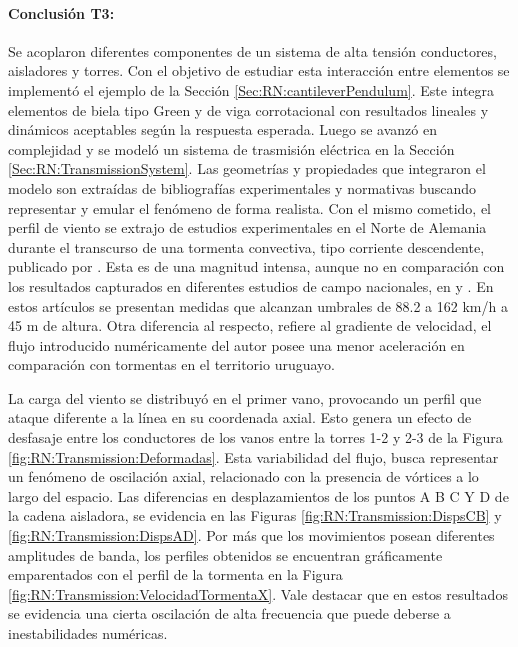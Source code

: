 \paragraph*{Conclusión T3:}
Se acoplaron diferentes componentes de un sistema de alta tensión conductores, aisladores y torres. Con el objetivo de estudiar esta interacción entre elementos se implementó el ejemplo de la Sección \ref{Sec:RN:cantileverPendulum}. Este integra elementos de biela tipo Green y de viga corrotacional con resultados lineales y dinámicos aceptables según la respuesta esperada. Luego se avanzó en complejidad y se modeló un sistema de trasmisión eléctrica en la Sección \ref{Sec:RN:TransmissionSystem}. Las geometrías y propiedades que integraron el modelo son extraídas de bibliografías experimentales y normativas buscando representar y emular el fenómeno de forma realista.  Con el mismo cometido, el perfil de viento se extrajo de estudios experimentales en el Norte de Alemania durante el transcurso de una tormenta convectiva, tipo corriente descendente, publicado por \cite{stengel2017measurements}. Esta es de una magnitud intensa, aunque no en comparación con los resultados capturados en diferentes estudios de campo nacionales, en \citep{duranona2009analysis} y \citep{duranona2019first}. En estos artículos se presentan medidas que alcanzan umbrales de 88.2 a 162 km/h a 45 m de altura. Otra diferencia al respecto, refiere al gradiente de velocidad, el flujo introducido numéricamente del autor \citeauthor{stengel2017measurements} posee una menor aceleración en comparación con tormentas en el territorio uruguayo. 

La carga del viento se distribuyó en el primer vano, provocando un perfil que ataque diferente a la línea en su coordenada axial. Esto genera un efecto de desfasaje entre los conductores de los vanos entre la torres 1-2 y 2-3 de la Figura \ref{fig:RN:Transmission:Deformadas}. Esta variabilidad del flujo, busca representar un fenómeno de oscilación axial, relacionado con la presencia de vórtices a lo largo del espacio. Las diferencias en desplazamientos de los puntos A B C Y D de la cadena aisladora, se evidencia en las Figuras \ref{fig:RN:Transmission:DispsCB} y \ref{fig:RN:Transmission:DispsAD}. Por más que los movimientos posean diferentes amplitudes de banda, los perfiles obtenidos se encuentran gráficamente emparentados con el perfil de la tormenta en la Figura \ref{fig:RN:Transmission:VelocidadTormentaX}. Vale destacar que en estos resultados se evidencia una cierta oscilación de alta frecuencia que puede deberse a inestabilidades numéricas.  

